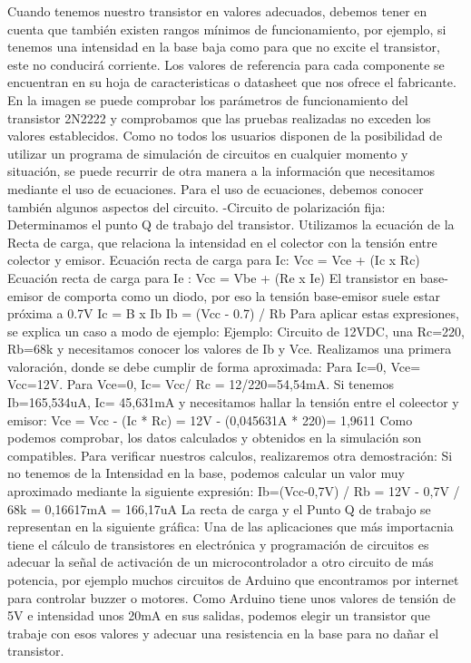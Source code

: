 \documentclass[11pt,a4paper]{article}
\begin{document}
 Cuando tenemos nuestro transistor en valores adecuados, debemos tener en cuenta que también existen rangos mínimos de funcionamiento, por ejemplo, si tenemos una intensidad en la base baja como para que no excite el transistor, este no conducirá corriente.
Los valores de referencia para cada componente se encuentran en su hoja de caracteristicas o datasheet que nos ofrece el fabricante.
En la imagen se puede comprobar los parámetros de funcionamiento del transistor 2N2222 y comprobamos que las pruebas realizadas no exceden los valores establecidos.
Como no todos los usuarios disponen de la posibilidad de utilizar un programa de simulación de circuitos en cualquier momento y situación, se puede recurrir de otra manera a la información que necesitamos mediante el uso de ecuaciones.
Para el uso de ecuaciones, debemos conocer también algunos aspectos del circuito.
-Circuito de polarización fija:
Determinamos el punto Q de trabajo del transistor.
Utilizamos la ecuación de la Recta de carga, que relaciona la intensidad en el colector con la tensión entre colector y emisor.
Ecuación recta de carga para Ic: Vcc = Vce + (Ic x Rc)
Ecuación recta de carga para Ie  : Vcc = Vbe + (Re x Ie)
El transistor en base-emisor de comporta como un diodo, por eso la tensión base-emisor suele estar próxima a 0.7V
Ic = B x Ib
Ib = (Vcc - 0.7) / Rb
Para aplicar estas expresiones, se explica un caso a modo de ejemplo:
Ejemplo: Circuito de 12VDC, una Rc=220, Rb=68k y necesitamos conocer los valores de Ib y Vce.
Realizamos una primera valoración, donde se debe cumplir de forma aproximada:
Para Ic=0, Vce= Vcc=12V. Para Vce=0, Ic= Vcc/ Rc = 12/220=54,54mA.
Si  tenemos Ib=165,534uA, Ic= 45,631mA y necesitamos hallar la tensión entre el coleector y emisor: 
Vce = Vcc - (Ic * Rc) = 12V - (0,045631A * 220)= 1,9611 
Como podemos comprobar, los datos calculados y obtenidos en la simulación son compatibles.
Para verificar nuestros calculos, realizaremos otra demostración:
Si no tenemos de la Intensidad en la base, podemos calcular un valor muy aproximado mediante la siguiente expresión:
Ib=(Vcc-0,7V) / Rb = 12V - 0,7V / 68k = 0,16617mA = 166,17uA
La recta de carga y el Punto Q de trabajo se representan en la siguiente gráfica:
 Una de las aplicaciones que más importacnia tiene el cálculo de transistores en electrónica y programación de circuitos es adecuar la señal de activación de un microcontrolador a otro circuito de más potencia, por ejemplo muchos circuitos de Arduino que encontramos por internet para controlar buzzer o motores.
 Como Arduino tiene unos valores de tensión de 5V e intensidad unos 20mA en sus salidas, podemos elegir un transistor que trabaje con esos valores y adecuar una resistencia en la base para no dañar el transistor.
\end{document}
